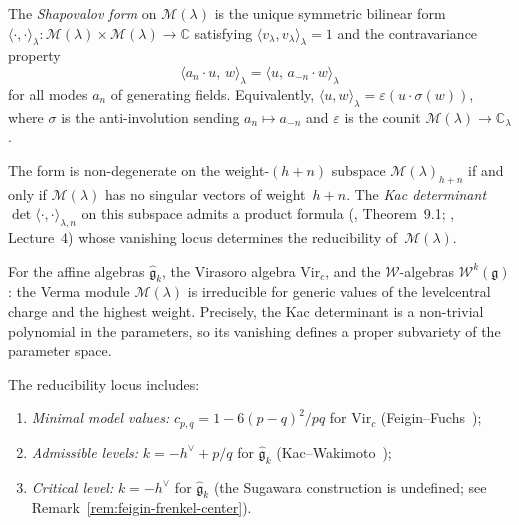 \begin{definition}\label{def:shapovalov-form}
The \emph{Shapovalov form} on $\mathcal{M}(\lambda)$ is the unique
symmetric bilinear form
$\langle\cdot,\cdot\rangle_\lambda \colon
\mathcal{M}(\lambda) \times \mathcal{M}(\lambda) \to \mathbb{C}$
satisfying $\langle v_\lambda, v_\lambda \rangle_\lambda = 1$ and
the contravariance property
\[
\langle a_n \cdot u,\, w \rangle_\lambda
= \langle u,\, a_{-n} \cdot w \rangle_\lambda
\]
for all modes $a_n$ of generating fields.  Equivalently, $\langle u, w
\rangle_\lambda = \varepsilon(u \cdot \sigma(w))$, where $\sigma$ is the
anti-involution sending $a_n \mapsto a_{-n}$ and $\varepsilon$ is the
counit $\mathcal{M}(\lambda) \to \mathbb{C}_\lambda$.

The form is non-degenerate on the weight-$(h{+}n)$ subspace
$\mathcal{M}(\lambda)_{h+n}$ if and only if $\mathcal{M}(\lambda)$ has
no singular vectors of weight~$h{+}n$.  The \emph{Kac determinant}
$\det\langle\cdot,\cdot\rangle_{\lambda,n}$ on this subspace admits a
product formula (\cite{Kac}, Theorem~9.1; \cite{KR87}, Lecture~4) whose
vanishing locus determines the reducibility of~$\mathcal{M}(\lambda)$.
\end{definition}

\begin{proposition}
\label{prop:generic-irreducibility}
For the affine algebras $\widehat{\mathfrak{g}}_k$, the Virasoro algebra
$\mathrm{Vir}_c$, and the $\mathcal{W}$-algebras $\mathcal{W}^k(\mathfrak{g})$:
the Verma module $\mathcal{M}(\lambda)$ is irreducible for generic values
of the level\/central charge and the highest weight.  Precisely, the Kac
determinant is a non-trivial polynomial in the parameters, so its
vanishing defines a proper subvariety of the parameter space.

The reducibility locus includes:
\begin{enumerate}[label=(\roman*)]
\item \emph{Minimal model values:} $c_{p,q} = 1 - 6(p-q)^2/pq$
   for $\mathrm{Vir}_c$ (Feigin--Fuchs~\cite{FF84});
\item \emph{Admissible levels:} $k = -h^\vee + p/q$ for
   $\widehat{\mathfrak{g}}_k$ (Kac--Wakimoto~\cite{KW88});
\item \emph{Critical level:} $k = -h^\vee$ for
   $\widehat{\mathfrak{g}}_k$ (the Sugawara construction is
   undefined; see Remark~\ref{rem:feigin-frenkel-center}).
\end{enumerate}
\end{proposition}

